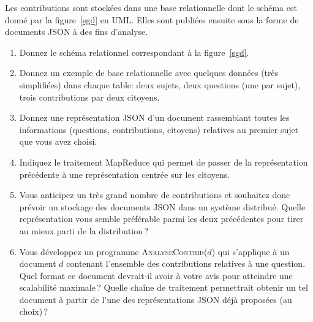 \documentclass[11pt,a4paper]{article}
\begin{document}
Les contributions sont stockées dans une base relationnelle dont le schéma est donné
par la figure~\ref{sgd} en UML. Elles sont publiées ensuite
sous la forme de documents JSON à des fins d'analyse. 

\begin{enumerate}
  \item Donnez le schéma relationnel correspondant à la figure~\ref{sgd}. 
  \item Donnez un exemple de base relationnelle avec quelques données (très simplifiées) dans chaque table: deux sujets,
      deux questions (une par sujet), trois contributions par deux citoyens. 
      
   \item Donnez une représentation JSON d'un document rassemblant toutes les informations
        (questions, contributions, citoyens) relatives au premier sujet que vous avez choisi.
        
    
    \item Indiquez le traitement MapReduce qui permet de passer de la représentation
          précédente à une représentation centrée sur les citoyens.
     
     \item Vous anticipez un très grand nombre de contributions et souhaitez
        donc prévoir un stockage des documents JSON dans un système distribué. Quelle représentation
        vous semble préférable parmi les deux précédentes pour tirer au mieux parti de la distribution\,? 
        
      \item Vous développez un programme \textsc{AnalyseContrib($d$)} qui s'applique à  un
         document $d$ contenant l'ensemble des contributions
          relatives à une question. Quel format ce document devrait-il avoir à
          votre avis pour atteindre une scalabilité maximale\,? 
          Quelle chaîne de traitement permettrait obtenir un tel document
          à partir de l'une des représentations JSON déjà proposées (au choix)\,?
\end{enumerate}
\end{document}
